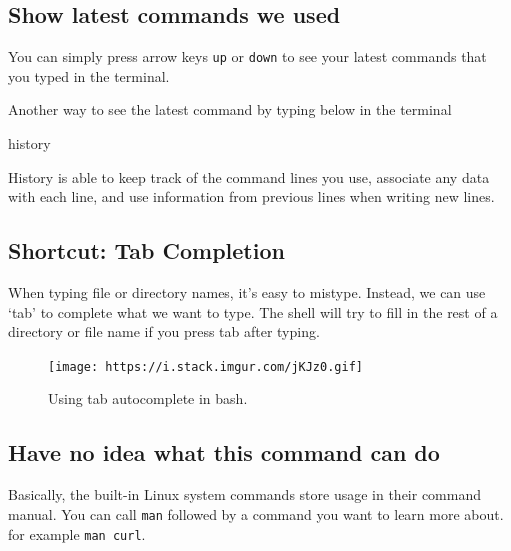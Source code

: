 \documentclass[
  letterpaper,
  DIV=11,
  numbers=noendperiod]{scrreprt}
\newenvironment{Shaded}{\begin{snugshade}}{\end{snugshade}}
\newcommand{\BuiltInTok}[1]{\textcolor[rgb]{0.00,0.23,0.31}{#1}}
\begin{document}
\hypertarget{show-latest-commands-we-used}{%
\subsection*{Show latest commands we
used}\label{show-latest-commands-we-used}}

You can simply press arrow keys \texttt{up} or \texttt{down} to see your
latest commands that you typed in the terminal.

Another way to see the latest command by typing below in the terminal

\begin{Shaded}
\begin{Highlighting}[]
\BuiltInTok{history}
\end{Highlighting}
\end{Shaded}

History is able to keep track of the command lines you use, associate
any data with each line, and use information from previous lines when
writing new lines.

\hypertarget{shortcut-tab-completion}{%
\subsection*{Shortcut: Tab Completion}\label{shortcut-tab-completion}}

When typing file or directory names, it's easy to mistype. Instead, we
can use `tab' to complete what we want to type. The shell will try to
fill in the rest of a directory or file name if you press tab after
typing.

\begin{figure}

{\centering \texttt{[image: https://i.stack.imgur.com/jKJz0.gif]}

}

\caption{Using tab autocomplete in bash.}

\end{figure}

\hypertarget{have-no-idea-what-this-command-can-do}{%
\subsection{Have no idea what this command can
do}\label{have-no-idea-what-this-command-can-do}}

Basically, the built-in Linux system commands store usage in their
command manual. You can call \texttt{man} followed by a command you want
to learn more about. for example \texttt{man\ curl}.
\end{document}
